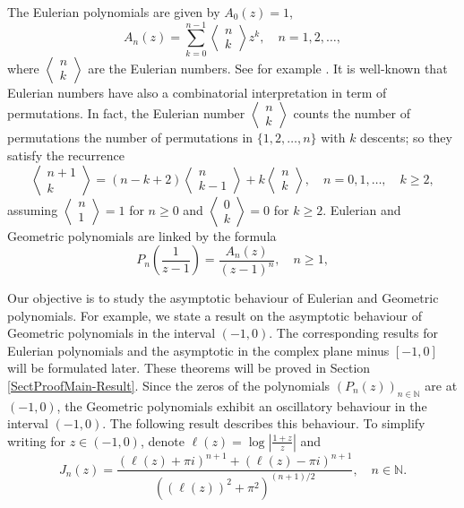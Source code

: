\documentclass[11pt]{article}
\newcommand{\N}{\mathbb{N}}
\begin{document}
The Eulerian polynomials are given  by $A_0(z)=1$,%
\[
A_n(z)=\sum_{k=0}^{n-1} \left\langle \begin{matrix} n \\ k \end{matrix} \right\rangle z^k,\quad n=1,2,\ldots,
\]
where $\left\langle \begin{matrix} n \\ k \end{matrix} \right\rangle$ are the Eulerian numbers. See  for example \cite[p. 51]{Com}. It is well-known that Eulerian numbers have also a combinatorial interpretation in term of permutations. In fact, the Eulerian number $\left\langle \begin{matrix} n \\ k \end{matrix} \right\rangle$  counts the number of permutations the number of permutations
in $\{1,2,\ldots,n\}$ with $k$ descents; so they satisfy the recurrence
\[
\left\langle \begin{matrix} n+1 \\ k \end{matrix} \right\rangle=(n-k+2)\left\langle \begin{matrix} n \\ k-1 \end{matrix} \right\rangle+k\left\langle \begin{matrix} n \\ k \end{matrix} \right\rangle,\quad n=0,1,\ldots, \quad k\ge 2,
\]
assuming $\left\langle\begin{matrix} n \\ 1 \end{matrix} \right\rangle=1$ for $n\ge 0$ and $\left\langle\begin{matrix} 0 \\ k \end{matrix} \right\rangle=0$ for $k\ge 2$. Eulerian and Geometric polynomials are linked by the formula
\begin{equation}
\label{conecEulerianPolvsGeomPol}
P_n\left(\frac{1}{z-1}\right)=\frac{A_n(z)}{(z-1)^n},\quad n\ge 1,
\end{equation}

Our objective  is to study the asymptotic behaviour of Eulerian and Geometric polynomials.  For example, we state a result on the asymptotic behaviour of Geometric polynomials in the interval $(-1,0)$. The corresponding results for Eulerian polynomials and the asymptotic in the complex plane minus $[-1,0]$ will be formulated later. These theorems will be proved in Section \ref{SectProofMain-Result}.  
Since the zeros of the polynomials $(P_n(z))_{n\in\N}$ are at $(-1,0)$, the Geometric polynomials exhibit an oscillatory behaviour in the interval $(-1,0)$. The following result describes this behaviour.
To simplify writing for $z\in (-1,0)$, denote $\ell(z)=\log|\frac{1+z}{z}|$
and 
\[
J_n(z)=\frac{(\ell(z)+\pi i)^{n+1}+(\ell(z)-\pi i)^{n+1}}{((\ell(z))^2+\pi^2)^{(n+1)/2}},\quad n\in \N.
\]
\end{document}
